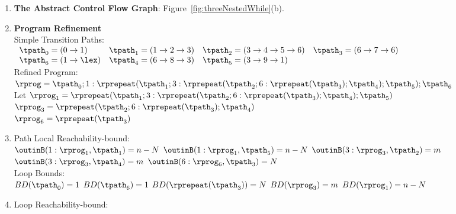 \begin{enumerate}
  \item  \textbf{The Abstract Control Flow Graph}: Figure~\ref{fig:threeNestedWhile}(b).

  \item \textbf{Program Refinement}
  \\
  {Simple Transition Paths:}
  \\
$
      \begin{array}{llll}
          \tpath_0 = (0 \to 1)
          &
          \tpath_1 = (1 \to 2 \to 3)
          &           
          \tpath_2 = (3 \to 4 \to 5 \to 6)
          &
          \tpath_3 = (6 \to 7 \to 6)
          \\
          \tpath_6 = (1 \to \lex)
          &
          \tpath_4 = (6 \to 8 \to 3)
          &
          \tpath_5 = (3 \to 9 \to 1)
      \end{array}
$
  \\
  Refined Program:
\\
$
  \rprog = \tpath_0 ; 
1: \rprepeat(\tpath_1; 3: \rprepeat(\tpath_2; 6: \rprepeat(\tpath_3); \tpath_4); \tpath_5); \tpath_6
$
\\
Let $\rprog_1 = \rprepeat(\tpath_1; 3: \rprepeat(\tpath_2; 6: \rprepeat(\tpath_3); \tpath_4); \tpath_5)$
\\
$\rprog_3 = \rprepeat(\tpath_2; 6: \rprepeat(\tpath_3); \tpath_4)$
\\
$\rprog_6 = \rprepeat(\tpath_3)$
  \item {Path Local Reachability-bound}:
\\
$\outinB(1: \rprog_1, \tpath_1) = n - N$ \quad
$\outinB(1: \rprog_1, \tpath_5) = n - N$ \quad
$\outinB(3: \rprog_3, \tpath_2) = m$ \\
$\outinB(3: \rprog_3, \tpath_4) = m$ \quad
$\outinB(6: \rprog_6, \tpath_3) = N$ \quad
%
\\
Loop Bounds:
\\
$BD(\tpath_0) = 1$
\quad
$BD(\tpath_6) = 1$
\quad
$BD( \rprepeat(\tpath_3)) = N $
\quad
$BD(\rprog_3) = m $
\quad
$BD(\rprog_1) = n - N $
%
\item Loop Reachability-bound:
\\
\end{enumerate}
